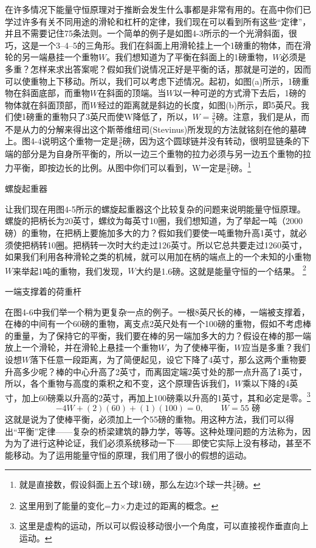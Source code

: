 \documentclass[12pt,oneside]{book}
\begin{document}
在许多情况下能量守恒原理对于推断会发生什么事都是非常有用的。在高中你们已学过许多有关不同用途的滑轮和杠杆的定律，我们现在可以看到所有这些“定律”，并且不需要记住75条法则。一个简单的例子是如图4-3所示的一个光滑斜面，很巧，这是一个3--4--5的三角形。我们在斜面上用滑轮挂上一个1磅重的物体，而在滑轮的另一端悬挂一个重物$ W $。我们想知道为了平衡在斜面上的1磅重物，$ W $必须是多重？怎样来求出答案呢？假如我们说情况正好是平衡的话，那就是可逆的，因而可以使重物上下移动。所以，我们可以考虑下述情况。起初，如图(a)所示，1磅重物在斜面底部，而重物$ W $在斜面的顶端。当$ W $以一种可逆的方式滑下去后，1磅的物体就在斜面顶部，而$ W $经过的距离就是斜边的长度，如图(b)所示，即5英尺。我们使1磅重的重物只了3英尺而使W降低了，所以，$ W=\frac{3}{5} $磅。注意，我们是从，而不是从力的分解来得出这个斯蒂维纽司(Stevinus)所发现的方法就铭刻在他的墓碑上。图4-4说明这个重物一定是$ \frac{3}{5} $磅，因为这个圆球链并没有转动，很明显链条的下端的部分是为自身所平衡的，所以一边三个重物的拉力必须与另一边五个重物的拉力平衡，即按边长的比例。从图中你们可以看到，W一定是$ \frac{3}{5} $磅。\footnote{就是直接数，假设斜面上五个球1磅，那么左边3个球一共$\frac{3}{5} $磅。}
\begin{fig}{螺旋起重器}
\caption{螺旋起重器}
\label{fig:螺旋起重器}
\end{fig}
让我们现在用图4-5所示的螺旋起重器这个比较复杂的问题来说明能量守恒原理。螺旋的把柄长为20英寸，螺纹为每英寸10圈，我们想知道，为了举起一吨（2000磅）的重物，在把柄上要施加多大的力？假如我们要使一吨重物升高1英寸，就必须使把柄转10圈。把柄转一次时大约走过126英寸。所以它总共要走过1260英寸，如果我们利用各种滑轮之类的机械，就可以用加在柄的端点上的一个未知的小重物$ W $来举起1吨的重物，我们发现，$ W $大约是1.6磅。这就是能量守恒的一个结果。
\footnote{这里用到了能量的变化=力$ \times $力走过的距离的概念。}
\begin{fig}{一端支撑着的荷重杆}
\caption{一端支撑着的荷重杆}
\label{fig:一端支撑着的荷重杆}
\end{fig}
在图4-6中我们举一个稍为更复杂一点的例子。一根8英尺长的棒，一端被支撑着，在棒的中间有一个60磅的重物，离支点2英尺处有一个100磅的重物，假如不考虑棒的重量，为了保持它的平衡，我们要在棒的另一端加多大的力？假设在棒的那一端放上一个滑轮，并在滑轮上悬挂一个重物$ W $，为了使棒平衡，$ W $应当是多重？我们设想$ W $落下任意一段距离，为了简便起见，设它下降了4英寸，那么这两个重物要升高多少呢？棒的中心升高了2英寸，而离固定端2英寸处的那一点升高了1英寸，所以，各个重物与高度的乘积之和不变，这个原理告诉我们，$ W $乘以下降的4英寸，加上60磅乘以升高的2英寸，再加上100磅乘以升高的1英寸，其和必定是零。\footnote{这里是虚构的运动，所以可以假设移动很小一个角度，可以直接视作垂直向上运动。}
\begin{equation}
\label{Eq:I:4:5}
-4W+(2)(60)+(1)(100)=0,\qquad
W=\text{$55$ 磅}
\end{equation}
这就是说为了使棒平衡，必须加上一个55磅的重物。用这种方法，我们可以得出“平衡”定律——复杂的桥梁建筑的静力学，等等。这种处理问题的方法称为，因为为了进行这种论证，我们必须系统移动一下——即使它实际上没有移动，甚至不能移动。为了运用能量守恒的原理，我们用了很小的假想的运动。
\end{document}
